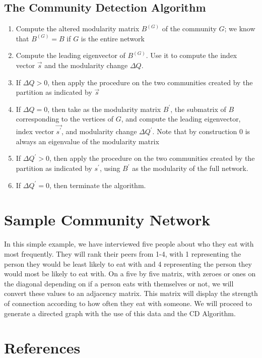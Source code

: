 \documentclass{article}
\begin{document}
\subsection{The Community Detection Algorithm}

\begin{enumerate}
  \item Compute the altered modularity matrix $B^{(G)}$ of the community $G$; we know that $B^{(G)} = B$ if $G$ is the entire network
  \item Compute the leading eigenvector of $B^{(G)}$. Use it to compute the index vector $\vec{s}$ and the modularity change $\Delta Q$.
  \item If $\Delta Q > 0$, then apply the procedure on the two communities created by the partition as indicated by $\vec{s}$
  \item If $\Delta Q = 0$, then take as the modularity matrix $B^\prime$, the submatrix of $B$ corresponding to the vertices of $G$, and compute the leading
        eigenvector, index vector $\vec{s^\prime}$, and modularity change $\Delta Q^{\prime}$. Note that by construction 0 is always an eigenvalue of the modularity matrix  
  \item If $\Delta Q^{\prime} > 0$, then apply the procedure on the two communities created by the partition as indicated by $s^\prime$, using $B^\prime$ as the modularity of the full network.
  \item If $\Delta Q^{\prime} = 0$, then terminate the algorithm.
\end{enumerate}

\section{Sample Community Network}
In this simple example, we have interviewed five people about who they eat with most frequently. 
They will rank their peers from 1-4, with 1 representing the person they would be least likely to eat with and 4 representing the person they would most be likely to eat with. 
On a five by five matrix, with zeroes or ones on the diagonal depending on if a person eats with themselves or not, we will convert these values to an adjacency matrix.
This matrix will display the strength of connection according to how often they eat with someone.
We will proceed to generate a directed graph with the use of this data and the CD Algorithm.

\pagebreak
\section{References}
\end{document}
